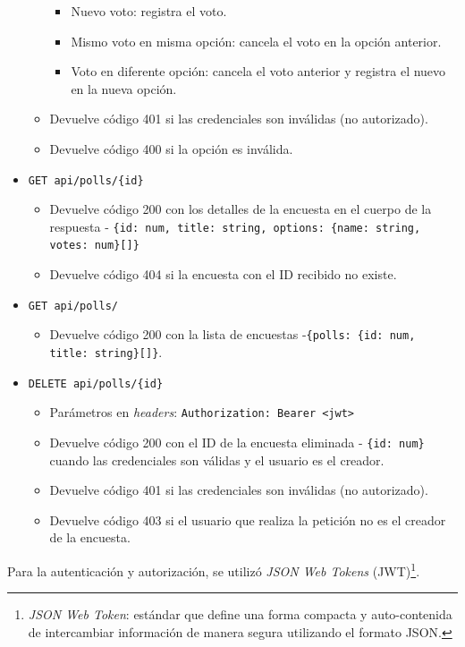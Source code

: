 \documentclass[11pt]{article}
\newcommand{\english}[1]{\textit{#1}}
\begin{document}
\begin{itemize}
\begin{itemize}
\begin{itemize}
            \item Nuevo voto: registra el voto.
            \item Mismo voto en misma opción: cancela el voto en la opción anterior.
            \item Voto en diferente opción: cancela el voto anterior y registra el nuevo en la nueva opción.
        \end{itemize}
        \item Devuelve código 401 si las credenciales son inválidas (no autorizado).
        \item Devuelve código 400 si la opción es inválida.
    \end{itemize}
    \item \lstinline|GET api/polls/{id}|
    \begin{itemize}
        \item Devuelve código 200 con los detalles de la encuesta en el cuerpo de la respuesta - \lstinline|{id: num, title: string, options: {name: string, votes: num}[]}|
        \item Devuelve código 404 si la encuesta con el ID recibido no existe.
    \end{itemize}
    \item \lstinline|GET api/polls/|
    \begin{itemize}
        \item Devuelve código 200 con la lista de encuestas -\enspace\lstinline|{polls: {id: num, title: string}[]}|.
    \end{itemize}
    \item \lstinline|DELETE api/polls/{id}|
    \begin{itemize}
        \item Parámetros en \english{headers}: \lstinline|Authorization: Bearer <jwt>|
        \item Devuelve código 200 con el ID de la encuesta eliminada - \lstinline|{id: num}| cuando las credenciales son válidas y el usuario es el creador.
        \item Devuelve código 401 si las credenciales son inválidas (no autorizado).
        \item Devuelve código 403 si el usuario que realiza la petición no es el creador de la encuesta.
    \end{itemize}
\end{itemize}

Para la autenticación y autorización, se utilizó \english{JSON Web Tokens} (JWT)\footnote{\english{JSON Web Token}: estándar que define una forma compacta y auto-contenida de intercambiar información de manera segura utilizando el formato JSON.}.
\end{document}
